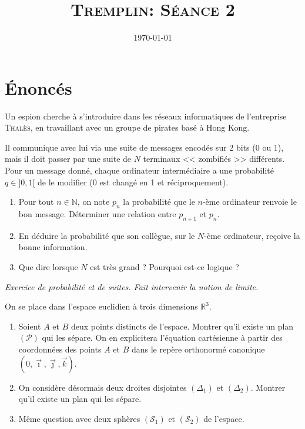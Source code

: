 \documentclass[12pt]{article}
\title{\textsc{Tremplin: Séance 2}}
\date{\today}
\author{}
\newcommand{\RR}{\mathbb R}
\newcommand{\NN}{\mathbb N}
\theoremstyle{definition}
\begin{document}
\maketitle

\section*{Énoncés}

\begin{exer}
Un espion cherche à s'introduire dans les réseaux informatiques de l'entreprise \textsc{Thalès}, en travaillant avec un groupe de pirates basé à Hong Kong.

Il communique avec lui via une suite de messages encodés sur 2 bits (0 ou 1), mais il doit passer par une suite de $N$ terminaux << zombifiés >> différents. Pour un message donné, chaque ordinateur intermédiaire a une probabilité $q\in{]0,1[}$ de le modifier (0 est changé en 1 et réciproquement).
\begin{enumerate}
	\item Pour tout $n\in\NN$, on note $p_n$ la probabilité que le $n$-ème ordinateur renvoie le bon message. Déterminer une relation entre $p_{n+1}$ et $p_n$. 
	\item En déduire la probabilité que son collègue, sur le $N$-ème ordinateur, reçoive la bonne information.
	\item Que dire lorsque $N$ est très grand ? Pourquoi est-ce logique ?
\end{enumerate}
\end{exer}

\textit{Exercice de probabilité et de suites. Fait intervenir la notion de limite.}

\begin{exer}
On se place dans l'espace euclidien à trois dimensions $\RR^3$.
\begin{enumerate}
	\item Soient $A$ et $B$ deux points distincts de l'espace. Montrer qu'il existe un plan $(\mathcal{P})$ qui les sépare. On en explicitera l'équation cartésienne à partir des coordonnées des points $A$ et $B$ dans le repère orthonormé canonique $(0,\vec{\imath},\vec{\jmath},\vec k)$.
	\item On considère désormais deux droites disjointes $(\Delta_1)$ et $(\Delta_2)$. Montrer qu'il existe un plan qui les sépare.
	\item Même question avec deux sphères $(\mathcal S_1)$ et $(\mathcal S_2)$ de l'espace.
\end{enumerate}
\end{exer}
\end{document}

